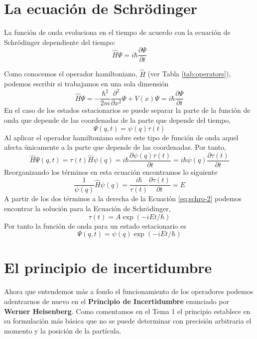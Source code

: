 \section{La ecuación de Schrödinger}
\begin{theorem}
La función de onda evoluciona en el tiempo de acuerdo 
con la ecuación de Schrödinger dependiente del tiempo:
\begin{equation}
    \hat{H}\Psi = i\hbar\frac{\partial \Psi}{\partial t}
\end{equation}
\end{theorem}
Como conocemos el operador hamiltoniano, $\hat{H}$ (ver
Tabla \ref{tab:operators}), podemos escribir si trabajamos
en una sola dimensión
\begin{equation}
    \hat{H}\Psi = 
      -\frac{\hbar^2}{2m}\frac{\partial^2}{\partial x^2}\Psi + V(x)\Psi = i\hbar\frac{\partial \Psi}{\partial t}
\end{equation}
En el caso de los estados estacionarios 
se puede separar la parte de la función de onda
que depende de las coordenadas de la parte que 
depende del tiempo,
\begin{equation}
    \Psi(q,t)=\psi(q)\tau(t)
\end{equation}
Al aplicar el operador hamiltoniano 
sobre este tipo de función de onda
aquel afecta únicamente a la parte
que depende de las coordenadas. Por
tanto,
\begin{equation}
    \hat{H}\Psi(q,t)=
    \tau(t)\hat{H}\psi(q)=
    i\hbar\frac{\partial\psi(q)\tau(t)}{\partial t}=
    i\hbar\psi(q)\frac{\partial \tau(t)}{\partial t}
\end{equation}
Reorganizando los términos en esta ecuación encontramos
lo siguiente
\begin{equation}
    \frac{1}{\psi(q)}\hat{H}\psi(q) = \frac{i\hbar}{\tau(t)}\frac{\partial \tau(t)}{\partial t}= E
    \label{eq:schro-2}
\end{equation}
A partir de los dos términos a la derecha de la Ecuación
\ref{eq:schro-2} podemos encontrar la solución para la
Ecuación de Schrödinger,
\begin{equation}
    \tau(t)=A\exp(-iEt/\hbar)
\end{equation}
Por tanto la función de onda para un estado estacionario
es
\begin{equation}
    \Psi(q,t)=\psi(q)\exp(-iEt/\hbar)
\end{equation}

\section{El principio de incertidumbre}
Ahora que entendemos más a fondo el funcionamiento de los
operadores podemos adentrarnos de nuevo en el
\textbf{Principio de Incertidumbre} enunciado por 
\textbf{Werner Heisenberg}. Como comentamos en el Tema 1
el principio establece en su formulación más básica que 
no se puede determinar con precisión  arbitraria el momento
y la posición de la partícula. 

